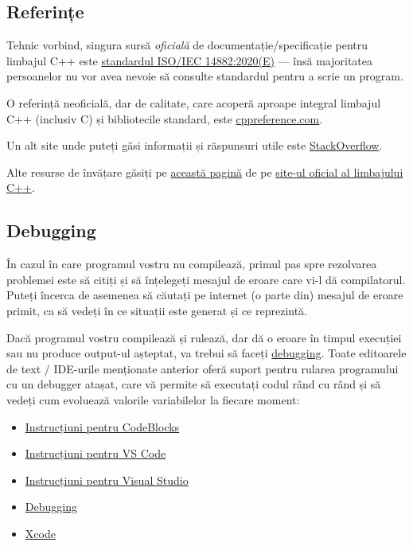 \subsection*{Referințe}

Tehnic vorbind, singura sursă \emph{oficială} de documentație/specificație pentru limbajul C++ este \href{https://isocpp.org/std/the-standard}{standardul ISO/IEC 14882:2020(E)} --- însă majoritatea persoanelor nu vor avea nevoie să consulte standardul pentru a scrie un program.

O referință neoficială, dar de calitate, care acoperă aproape integral limbajul C++ (inclusiv C) și bibliotecile standard, este \href{https://en.cppreference.com/w/}{cppreference.com}.

Un alt site unde puteți găsi informații și răspunsuri utile este \href{https://stackoverflow.com/}{StackOverflow}.

Alte resurse de învățare găsiți pe \href{https://isocpp.org/get-started}{această pagină} de pe \href{https://isocpp.org/}{site-ul oficial al limbajului C++}.

\subsection*{Debugging}

În cazul în care programul vostru nu compilează, primul pas spre rezolvarea problemei este să citiți și să înțelegeți mesajul de eroare care vi-l dă compilatorul. Puteți încerca de asemenea să căutați pe internet (o parte din) mesajul de eroare primit, ca să vedeți în ce situații este generat și ce reprezintă.

Dacă programul vostru compilează și rulează, dar dă o eroare în timpul execuției sau nu produce output-ul așteptat, va trebui să faceți \href{https://www.freecodecamp.org/news/what-is-debugging-how-to-debug-code/}{debugging}. Toate editoarele de text / IDE-urile menționate anterior oferă suport pentru rularea programului cu un debugger atașat, care vă permite să executați codul rând cu rând și să vedeți cum evoluează valorile variabilelor la fiecare moment:

\begin{itemize}
    \item \href{https://wiki.codeblocks.org/index.php/Debugging_with_Code::Blocks}{Instrucțiuni pentru CodeBlocks}
    \item \href{https://code.visualstudio.com/docs/editor/debugging}{Instrucțiuni pentru VS Code}
    \item \href{https://learn.microsoft.com/en-us/visualstudio/debugger/debugger-feature-tour?view=vs-2022}{Instrucțiuni pentru Visual Studio}
    \item \href{https://www.jetbrains.com/help/clion/debugging-code.html}{Debugging}
    \item \href{https://developer.apple.com/documentation/xcode/stepping-through-code-and-inspecting-variables-to-isolate-bugs}{Xcode}
\end{itemize}
